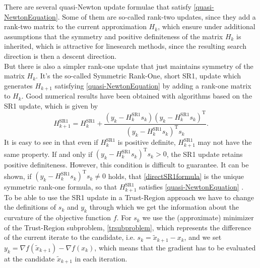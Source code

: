There are several quasi-Newton update formulae that satisfy \cref{quasi-NewtonEquation}. Some of them are so-called rank-two updates, since they add a rank-two matrix to the current approximation $H_k$, which ensure under additional assumptions that the symmetry and positive definiteness of the matrix $H_k$ is inherited, which is attractive for linesearch methods, since the resulting search direction is then a descent direction. \\
But there is also a simpler rank-one update that just maintains symmetry of the matrix $H_k$. It's the so-called Symmetric Rank-One, short SR1, update which generates $H_{k+1}$ satisfying \cref{quasi-NewtonEquation} by adding a rank-one matrix to $H_k$. Good numerical results have been obtained with algorithms based on the SR1 update, which is given by
\begin{equation}\label{directSR1formula}
    H^\mathrm{SR1}_{k+1} = H^\mathrm{SR1}_k + \frac{(y_k - H^\mathrm{SR1}_k s_k) (y_k - H^\mathrm{SR1}_k s_k)^{\mathrm{T}}}{(y_k - H^\mathrm{SR1}_k s_k)^{\mathrm{T}} s_k}.
\end{equation}
It is easy to see in that even if $H^\mathrm{SR1}_k$ is positive definite, $H^\mathrm{SR1}_{k+1}$ may not have the same property. If and only if $(y_k - H^\mathrm{SR1}_k s_k)^{\mathrm{T}} s_k > 0$, the SR1 update retains positive definiteness. However, this condition is difficult to guarantee. It can be shown, if $(y_k - H^\mathrm{SR1}_k s_k)^{\mathrm{T}} s_k \neq 0$ holds, that \cref{directSR1formula} is the unique symmetric rank-one formula, so that $H^\mathrm{SR1}_{k+1}$ satisfies \cref{quasi-NewtonEquation} \cite[p.~144-145]{NocedalWright:2006}. \\

To be able to use the SR1 update in a Trust-Region approach we have to change the definitions of $s_k$ and $y_k$ through which we get the information about the curvature of the objective function $f$. For $s_k$ we use the (approximate) minimizer of the Trust-Region subproblem, \cref{trsubproblem}, which represents the difference of the current iterate to the candidate, i.e. $s_k = \widetilde{x}_{k+1} - x_k$, and we set $y_k = \nabla f(\widetilde{x}_{k+1}) - \nabla f(x_k)$, which means that the gradient has to be evaluated at the candidate $\widetilde{x}_{k+1}$ in each iteration. \\

